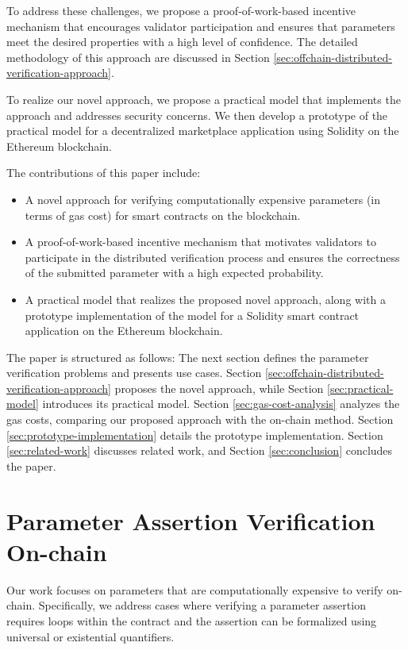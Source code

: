 \documentclass[runningheads]{llncs}
\begin{document}
To address these challenges, we propose a proof-of-work-based incentive mechanism that encourages validator participation and ensures that parameters meet the desired properties with a high level of confidence. The detailed methodology of this approach are discussed in Section \ref{sec:offchain-distributed-verification-approach}.

To realize our novel approach, we propose a practical model that implements the approach and addresses security concerns. We then develop a prototype of the practical model for a decentralized marketplace application using Solidity on the Ethereum blockchain.

The contributions of this paper include:
\begin{itemize}
    \item A novel approach for verifying computationally expensive parameters (in terms of gas cost) for smart contracts on the blockchain.
    \item A proof-of-work-based incentive mechanism that motivates validators to participate in the distributed verification process and ensures the correctness of the submitted parameter with a high expected probability.
    \item A practical model that realizes the proposed novel approach, along with a prototype implementation of the model for a Solidity smart contract application on the Ethereum blockchain.
\end{itemize}


The paper is structured as follows: The next section defines the parameter verification problems and presents use cases. Section \ref{sec:offchain-distributed-verification-approach} proposes the novel approach, while Section \ref{sec:practical-model} introduces its practical model. Section \ref{sec:gas-cost-analysis} analyzes the gas costs, comparing our proposed approach with the on-chain method. Section \ref{sec:prototype-implementation} details the prototype implementation. Section \ref{sec:related-work} discusses related work, and Section \ref{sec:conclusion} concludes the paper.
\section{Parameter Assertion Verification On-chain}
\label{sec:parameter-assertion-verification-onchain}
Our work focuses on parameters that are computationally expensive to verify on-chain. Specifically, we address cases where verifying a parameter assertion requires loops within the contract and the assertion can be formalized using universal or existential quantifiers.
\end{document}
